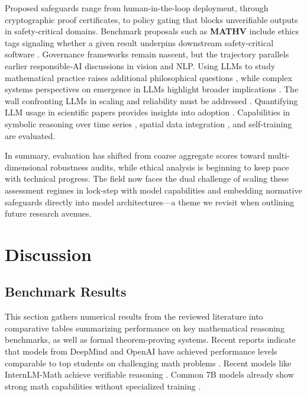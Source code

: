 \documentclass[acmsmall,anonymous]{acmart}
\begin{document}
Proposed safeguards range from human-in-the-loop deployment, through cryptographic proof certificates, to policy gating that blocks unverifiable outputs in safety-critical domains.  Benchmark proposals such as \textbf{MATHV} include ethics tags signaling whether a given result underpins downstream safety-critical software \cite{wang2024mathv}.  Governance frameworks remain nascent, but the trajectory parallels earlier responsible‐AI discussions in vision and NLP. Using LLMs to study mathematical practice raises additional philosophical questions \cite{dalessandro2025usingllmmathpractice,anonymous2025usingllmmathpractice}, while complex systems perspectives on emergence in LLMs highlight broader implications \cite{mitchell2025largescaleemergence,anonymous2025largescaleemergence}. The wall confronting LLMs in scaling and reliability must be addressed \cite{coveney2025wall,anonymous2025wall}. Quantifying LLM usage in scientific papers provides insights into adoption \cite{liang2025quantifying}. Capabilities in symbolic reasoning over time series \cite{liu2025can}, spatial data integration \cite{han2025can}, and self-training \cite{shafayat2025can} are evaluated.

\bigskip
In summary, evaluation has shifted from coarse aggregate scores toward multi-dimensional robustness audits, while ethical analysis is beginning to keep pace with technical progress.  The field now faces the dual challenge of scaling these assessment regimes in lock-step with model capabilities and embedding normative safeguards directly into model architectures—a theme we revisit when outlining future research avenues.


\section{Discussion}\label{sec:benchmarks}
\subsection{Benchmark Results}

This section gathers numerical results from the reviewed literature into
comparative tables summarizing performance on key mathematical reasoning benchmarks, as well as formal theorem-proving systems. Recent reports indicate that models from DeepMind and OpenAI have achieved performance levels comparable to top students on challenging math problems \cite{gibney2025deepmindopenai,anonymous2025deepmindopenai}. Recent models like InternLM-Math achieve verifiable reasoning \cite{ying2024 b internlm}. Common 7B models already show strong math capabilities without specialized training \cite{li2024a common}.
\end{document}
